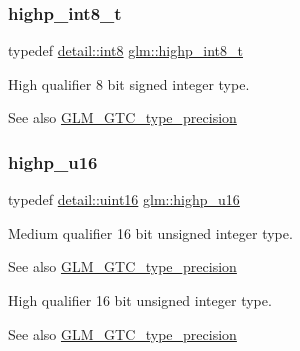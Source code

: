 \subsubsection{\texorpdfstring{highp\+\_\+int8\+\_\+t}{highp\_int8\_t}}
{\footnotesize\ttfamily typedef \hyperlink{namespaceglm_1_1detail_a04b526a8d7a9b455602a0afa78c531e0}{detail\+::int8} \hyperlink{group__gtc__type__precision_ga417701b99e6e7992f35ab2ef694f88b2}{glm\+::highp\+\_\+int8\+\_\+t}}

High qualifier 8 bit signed integer type. \begin{DoxySeeAlso}{See also}
\hyperlink{group__gtc__type__precision}{G\+L\+M\+\_\+\+G\+T\+C\+\_\+type\+\_\+precision} 
\end{DoxySeeAlso}
\mbox{\label{group__gtc__type__precision_ga9da2178d7501d9c0f225fa1a7b70cb45}} 
\subsubsection{\texorpdfstring{highp\+\_\+u16}{highp\_u16}}
{\footnotesize\ttfamily typedef \hyperlink{namespaceglm_1_1detail_a47b2a7d006d187338e8031a352d1ce56}{detail\+::uint16} \hyperlink{group__gtc__type__precision_ga9da2178d7501d9c0f225fa1a7b70cb45}{glm\+::highp\+\_\+u16}}

Medium qualifier 16 bit unsigned integer type. \begin{DoxySeeAlso}{See also}
\hyperlink{group__gtc__type__precision}{G\+L\+M\+\_\+\+G\+T\+C\+\_\+type\+\_\+precision}
\end{DoxySeeAlso}
High qualifier 16 bit unsigned integer type. \begin{DoxySeeAlso}{See also}
\hyperlink{group__gtc__type__precision}{G\+L\+M\+\_\+\+G\+T\+C\+\_\+type\+\_\+precision} 
\end{DoxySeeAlso}
\mbox{\label{group__gtc__type__precision_gae8e8a2c712653891a03c171795286ac5}} 
